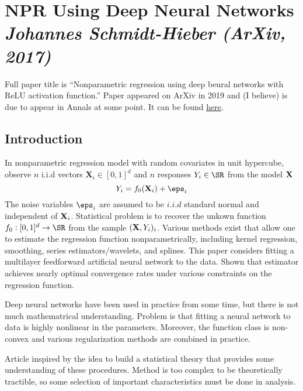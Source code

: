 
\section{NPR Using Deep Neural Networks \textit{\small Johannes Schmidt-Hieber (ArXiv, 2017)}}

Full paper title is ``Nonparametric regression using deep beural networks with ReLU activation function.'' Paper appeared on ArXiv in 2019 and (I believe) is due to appear in Annals at some point. It can be found \href{https://arxiv.org/pdf/1708.06633.pdf}{here}.

\subsection{Introduction}

In nonparametric regression model with random covariates in unit hypercube, observe $n$ i.i.d vectors $\mathbf{X}_i \in [0,1]^d$ and $n$ responses $Y_i \in \SR$ from the model $\mathbf{X}$
\begin{equation}
	\label{eq:sh-1}
	Y_i = f_0(\mathbf{X}_i) + \eps_i
\end{equation}
The noise variables $\eps_i$ are assumed to be $i.i.d$ standard normal and independent of $\mathbf{X}_i$. Statistical problem is to recover the unkown function $f_0: [0,1]^d\to\SR$ from the sample $(\mathbf{X}, Y_i)_i$. Various methods exist that allow one to estimate the regression function nonparametrically, including kernel regression, smoothing, series estimators/wavelets, and splines. This paper considers fitting a multilayer feedforward artificial neural network to the data. Shown that estimator achieves nearly optimal convergence rates under various constraints on the regression function.

Deep neural networks have been used in practice from some time, but there is not much mathematrical understanding. Problem is that fitting a neural network to data is highly nonlinear in the parameters. Moreover, the function class is non-convex and various regularization methods are combined in practice. 

Article inspired by the idea to build a statistical theory that provides some understanding of these procedures. Method is too complex to be theoretically tractible, so some selection of important characteristics must be done in analysis. 

